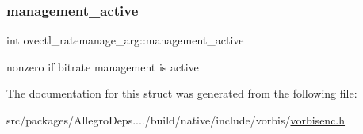 \subsubsection{\texorpdfstring{management\+\_\+active}{management\_active}}
{\footnotesize\ttfamily int ovectl\+\_\+ratemanage\+\_\+arg\+::management\+\_\+active}

nonzero if bitrate management is active 

The documentation for this struct was generated from the following file\+:\begin{DoxyCompactItemize}
\item 
src/packages/\+Allegro\+Deps..../build/native/include/vorbis/\hyperlink{vorbisenc_8h}{vorbisenc.\+h}\end{DoxyCompactItemize}
